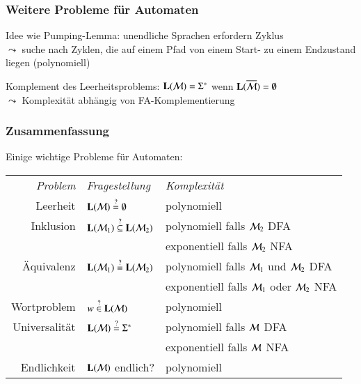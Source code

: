 \documentclass[onlymath]{beamer}
\begin{document}
\begin{frame}\frametitle{Weitere Probleme für Automaten}


\pause

Idee wie Pumping-Lemma: unendliche Sprachen erfordern Zyklus\\
$\leadsto$ suche nach Zyklen, die auf einem Pfad von einem Start- zu einem Endzustand liegen (polynomiell)\pause

\pause

Komplement des Leerheitsproblems: $\textbf{\textcolor{black}{L}}(\mathcal{M})=\Sigma^*$ wenn $\textbf{\textcolor{black}{L}}(\overline{\mathcal{M}})=\emptyset$\\
$\leadsto$ Komplexität abhängig von FA-Komplementierung


\end{frame}

\begin{frame}\frametitle{Zusammenfassung}

Einige wichtige Probleme für Automaten:\bigskip

\begin{tabular}{@{}rll@{}}
\emph{Problem} & \emph{Fragestellung} & \emph{Komplexität} \\[1ex]
Leerheit & $\textbf{\textcolor{black}{L}}(\mathcal{M})\stackrel{?}{=}\emptyset$  & polynomiell\\[1ex]
Inklusion & $\textbf{\textcolor{black}{L}}(\mathcal{M}_1)\stackrel{?}{\subseteq}\textbf{\textcolor{black}{L}}(\mathcal{M}_2)$  & polynomiell falls $\mathcal{M}_2$ DFA\\[-0.5ex]
	& & exponentiell falls $\mathcal{M}_2$ NFA\\[1ex]
Äquivalenz & $\textbf{\textcolor{black}{L}}(\mathcal{M}_1)\stackrel{?}{=}\textbf{\textcolor{black}{L}}(\mathcal{M}_2)$  & polynomiell falls $\mathcal{M}_1$ und $\mathcal{M}_2$ DFA\\[-0.5ex]
	& & exponentiell falls $\mathcal{M}_1$ oder $\mathcal{M}_2$ NFA\\[1ex]
Wortproblem & $w\stackrel{?}{\in}\textbf{\textcolor{black}{L}}(\mathcal{M})$  & polynomiell\\[1ex]
Universalität & $\textbf{\textcolor{black}{L}}(\mathcal{M})\stackrel{?}{=}\Sigma^*$  & polynomiell falls $\mathcal{M}$ DFA\\[-0.5ex]
	& & exponentiell falls $\mathcal{M}$ NFA\\[1ex]
Endlichkeit & $\textbf{\textcolor{black}{L}}(\mathcal{M})$ endlich? & polynomiell 
\end{tabular}

\end{frame}
\end{document}
